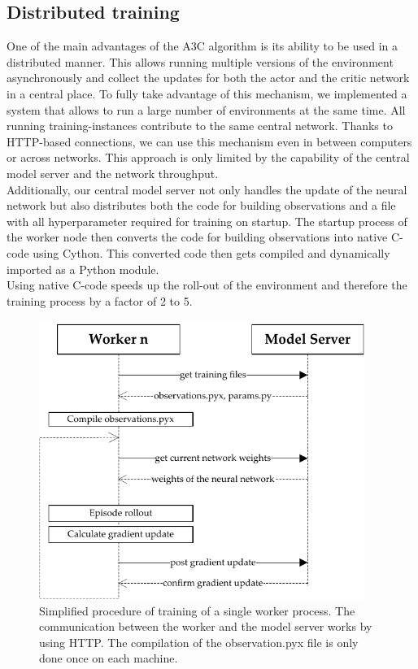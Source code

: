 \subsection*{Distributed training}
One of the main advantages of the A3C algorithm is its ability to be used in a distributed manner. This allows running multiple versions of the environment asynchronously and collect the updates for both the actor and the critic network in a central place. To fully take advantage of this mechanism, we implemented a system that allows to run a large number of environments at the same time. All running training-instances contribute to the same central network. Thanks to HTTP-based connections, we can use this mechanism even in between computers or across networks. This approach is only limited by the capability of the central model server and the network throughput.\\
Additionally, our central model server not only handles the update of the neural network but also distributes both the code for building observations and a file with all hyperparameter required for training on startup. The startup process of the worker node then converts the code for building observations into native C-code using Cython. This converted code then gets compiled and dynamically imported as a Python module.\\
Using native C-code speeds up the roll-out of the environment and therefore the training process by a factor of 2 to 5.
\begin{figure}[H]
	\centering
	\includegraphics[width=300pt]{diagrams/distributed_training_update.pdf}
	\caption{Simplified procedure of training of a single worker process. The communication between the worker and the model server works by using HTTP. The compilation of the observation.pyx file is only done once on each machine.}
	\label{obs_descr} %
\end{figure}
